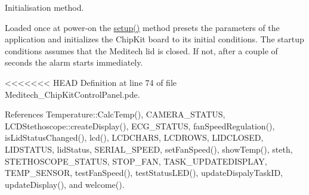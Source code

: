 \begin{DoxyCode}
\begin{DoxyCode}
\begin{DoxyCode}
Initialisation method. 

Loaded once at power-\/on the \hyperlink{_meditech___chip_kit_control_panel_8pde_a4fc01d736fe50cf5b977f755b675f11d}{setup()} method presets the parameters of the application and initializes the Chip\-Kit board to its initial conditions. The startup conditions assumes that the Meditech lid is closed. If not, after a couple of seconds the alarm starts immediately. 

<<<<<<< HEAD
Definition at line 74 of file Meditech\-\_\-\-Chip\-Kit\-Control\-Panel.\-pde.



References Temperature\-::\-Calc\-Temp(), C\-A\-M\-E\-R\-A\-\_\-\-S\-T\-A\-T\-U\-S, L\-C\-D\-Stethoscope\-::create\-Display(), E\-C\-G\-\_\-\-S\-T\-A\-T\-U\-S, fan\-Speed\-Regulation(), is\-Lid\-Status\-Changed(), lcd(), L\-C\-D\-C\-H\-A\-R\-S, L\-C\-D\-R\-O\-W\-S, L\-I\-D\-C\-L\-O\-S\-E\-D, L\-I\-D\-S\-T\-A\-T\-U\-S, lid\-Status, S\-E\-R\-I\-A\-L\-\_\-\-S\-P\-E\-E\-D, set\-Fan\-Speed(), show\-Temp(), steth, S\-T\-E\-T\-H\-O\-S\-C\-O\-P\-E\-\_\-\-S\-T\-A\-T\-U\-S, S\-T\-O\-P\-\_\-\-F\-A\-N, T\-A\-S\-K\-\_\-\-U\-P\-D\-A\-T\-E\-D\-I\-S\-P\-L\-A\-Y, T\-E\-M\-P\-\_\-\-S\-E\-N\-S\-O\-R, test\-Fan\-Speed(), test\-Status\-L\-E\-D(), update\-Dispaly\-Task\-I\-D, update\-Display(), and welcome().



\end{DoxyCode}
\end{DoxyCode}
\end{DoxyCode}
